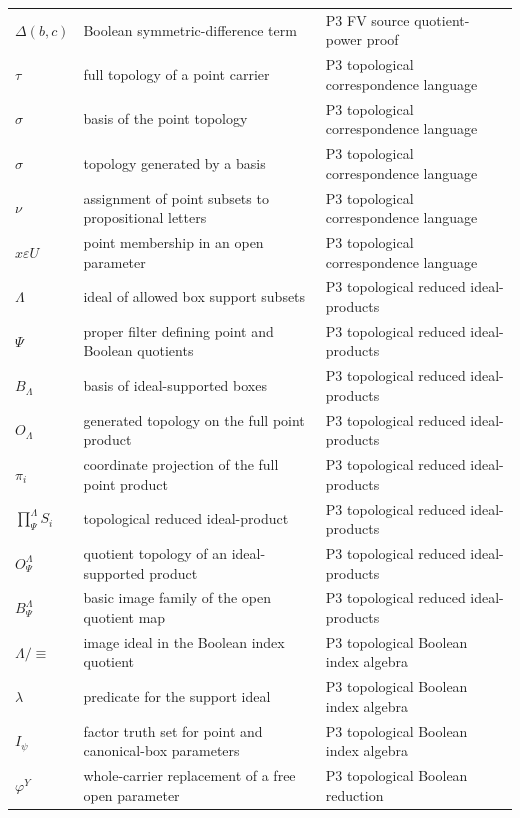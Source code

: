 \begin{longtable}{@{}p{}p{}p{}@{}}
\(\Delta(b,\allowbreak c)\) & Boolean symmetric-difference term & P3 FV source quotient-\allowbreak{}power proof \\
\(\tau\) & full topology of a point carrier & P3 topological correspondence language \\
\(\sigma\) & basis of the point topology & P3 topological correspondence language \\
\(\widehat\sigma\) & topology generated by a basis & P3 topological correspondence language \\
\(\nu\) & assignment of point subsets to propositional letters & P3 topological correspondence language \\
\(x\varepsilon U\) & point membership in an open parameter & P3 topological correspondence language \\
\(\Lambda\) & ideal of allowed box support subsets & P3 topological reduced ideal-\allowbreak{}products \\
\(\Psi\) & proper filter defining point and Boolean quotients & P3 topological reduced ideal-\allowbreak{}products \\
\(B_\Lambda\) & basis of ideal-supported boxes & P3 topological reduced ideal-\allowbreak{}products \\
\(O_\Lambda\) & generated topology on the full point product & P3 topological reduced ideal-\allowbreak{}products \\
\(\pi_i\) & coordinate projection of the full point product & P3 topological reduced ideal-\allowbreak{}products \\
\(\prod^\Lambda_\Psi S_i\) & topological reduced ideal-product & P3 topological reduced ideal-\allowbreak{}products \\
\(O^\Lambda_\Psi\) & quotient topology of an ideal-supported product & P3 topological reduced ideal-\allowbreak{}products \\
\(B^\Lambda_\Psi\) & basic image family of the open quotient map & P3 topological reduced ideal-\allowbreak{}products \\
\(\Lambda/{\equiv}\) & image ideal in the Boolean index quotient & P3 topological Boolean index algebra \\
\(\lambda\) & predicate for the support ideal & P3 topological Boolean index algebra \\
\(I_\psi\) & factor truth set for point and canonical-box parameters & P3 topological Boolean index algebra \\
\(\varphi^Y\) & whole-carrier replacement of a free open parameter & P3 topological Boolean reduction \\

\end{longtable}
